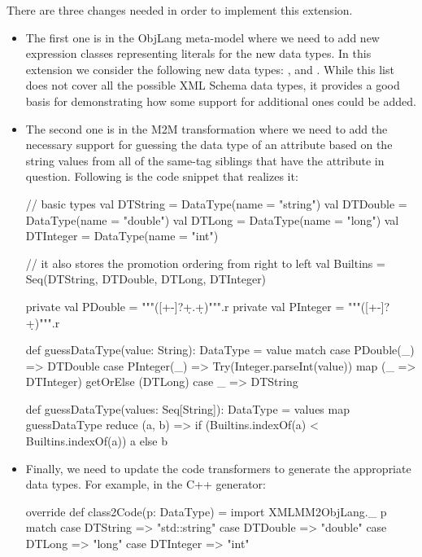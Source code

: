 There are three changes needed in order to implement this extension.
\begin{itemize}[(1)]
	\item The first one is in the ObjLang meta-model where we need to add new expression classes representing literals for the new data types.
	In this extension we consider the following new data types: ,  and .
	While this list does not cover all the possible XML Schema data types, it provides a good basis for demonstrating how some support for additional ones could be added.

	\item The second one is in the M2M transformation where we need to add the necessary support for guessing the data type of an attribute based on the string values from all of the same-tag siblings that have the attribute in question.
	Following is the code snippet that realizes it:
	\begin{scalacode}
	  // basic types
	  val DTString = DataType(name = "string")
	  val DTDouble = DataType(name = "double")
	  val DTLong = DataType(name = "long")
	  val DTInteger = DataType(name = "int")

	  // it also stores the promotion ordering from right to left
	  val Builtins = Seq(DTString, DTDouble, DTLong, DTInteger)

	  private val PDouble = """([+-]?\d+.\d+)""".r
	  private val PInteger = """([+-]?\d+)""".r

	  def guessDataType(value: String): DataType = value match {
	    case PDouble(_) => DTDouble
	    case PInteger(_) => Try(Integer.parseInt(value)) map (_ => DTInteger) getOrElse (DTLong)
	    case _ => DTString
	  }

	  def guessDataType(values: Seq[String]): DataType =
	    values map guessDataType reduce { (a, b) =>
	      if (Builtins.indexOf(a) < Builtins.indexOf(a)) a else b
	    }
	\end{scalacode}

	\item Finally, we need to update the code transformers to generate the appropriate data types.
	For example, in the C++ generator:
	\begin{scalacode}
override def class2Code(p: DataType) = {
  import XMLMM2ObjLang._
  p match {
    case DTString => "std::string"
    case DTDouble => "double"
    case DTLong => "long"
    case DTInteger => "int"
  }
}		
	\end{scalacode}

\end{itemize}




